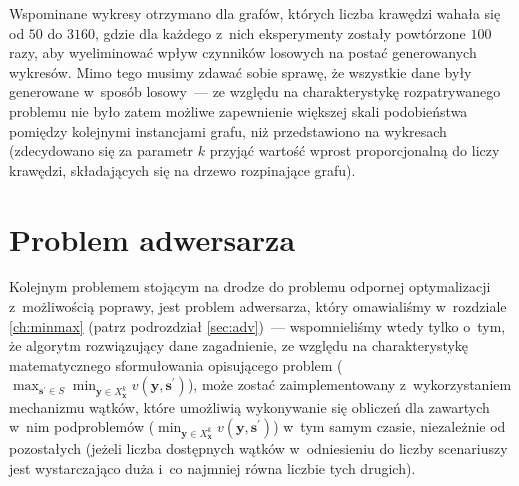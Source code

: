 Wspominane wykresy otrzymano dla grafów, których liczba krawędzi wahała się od $50$ do $3160$, gdzie dla każdego z~nich eksperymenty zostały powtórzone $100$ razy, aby wyeliminować wpływ czynników losowych na postać generowanych wykresów.
Mimo tego musimy zdawać sobie sprawę, że wszystkie dane były generowane w~sposób losowy~--- ze względu na charakterystykę rozpatrywanego problemu nie było zatem możliwe zapewnienie większej skali podobieństwa pomiędzy kolejnymi instancjami grafu, niż przedstawiono na wykresach (zdecydowano się za parametr $k$ przyjąć wartość wprost proporcjonalną do liczy krawędzi, składających się na drzewo rozpinające grafu).




\section{Problem adwersarza}




Kolejnym problemem stojącym na drodze do problemu odpornej optymalizacji z~możliwością poprawy, jest problem adwersarza, który omawialiśmy w~rozdziale \ref{ch:minmax} (patrz podrozdział \ref{sec:adv})~--- wspomnieliśmy wtedy tylko o~tym, że algorytm rozwiązujący dane zagadnienie, ze względu na charakterystykę matematycznego sformułowania opisującego problem ($\max_{\textbf{s}^{\prime} \in S} \min_{\textbf{y} \in X^{k}_{\textbf{x}}} v \left( \textbf{y}, \textbf{s}^{\prime} \right)$), może zostać zaimplementowany z~wykorzystaniem mechanizmu wątków, które umożliwią wykonywanie się obliczeń dla zawartych w~nim podproblemów ($\min_{\textbf{y} \in X^{k}_{\textbf{x}}} v \left( \textbf{y}, \textbf{s}^{\prime} \right)$) w~tym samym czasie, niezależnie od pozostałych (jeżeli liczba dostępnych wątków w~odniesieniu do liczby scenariuszy jest wystarczająco duża i~co najmniej równa liczbie tych drugich). 

